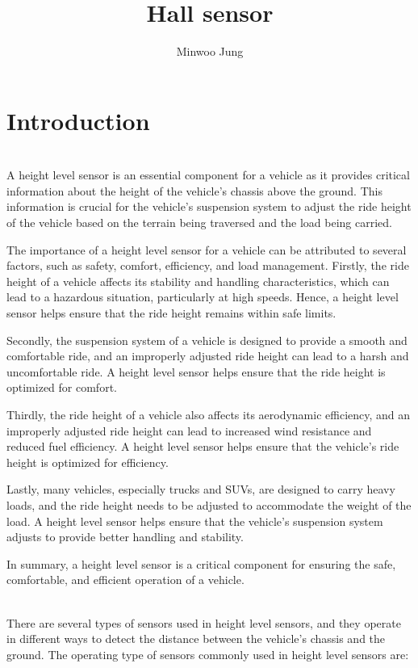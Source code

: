\documentclass[11pt]{article}
\title{Hall sensor}
\author{Minwoo Jung}
\begin{document}
\maketitle

\section{Introduction}
\indent \\A height level sensor is an essential component for a vehicle as it provides critical information about the height of the vehicle's chassis above the ground. This information is crucial for the vehicle's suspension system to adjust the ride height of the vehicle based on the terrain being traversed and the load being carried.

The importance of a height level sensor for a vehicle can be attributed to several factors, such as safety, comfort, efficiency, and load management. Firstly, the ride height of a vehicle affects its stability and handling characteristics, which can lead to a hazardous situation, particularly at high speeds. Hence, a height level sensor helps ensure that the ride height remains within safe limits.

Secondly, the suspension system of a vehicle is designed to provide a smooth and comfortable ride, and an improperly adjusted ride height can lead to a harsh and uncomfortable ride. A height level sensor helps ensure that the ride height is optimized for comfort.

Thirdly, the ride height of a vehicle also affects its aerodynamic efficiency, and an improperly adjusted ride height can lead to increased wind resistance and reduced fuel efficiency. A height level sensor helps ensure that the vehicle's ride height is optimized for efficiency.

Lastly, many vehicles, especially trucks and SUVs, are designed to carry heavy loads, and the ride height needs to be adjusted to accommodate the weight of the load. A height level sensor helps ensure that the vehicle's suspension system adjusts to provide better handling and stability.

In summary, a height level sensor is a critical component for ensuring the safe, comfortable, and efficient operation of a vehicle.

\indent \\There are several types of sensors used in height level sensors, and they operate in different ways to detect the distance between the vehicle's chassis and the ground. The operating type of sensors commonly used in height level sensors are:
\end{document}
